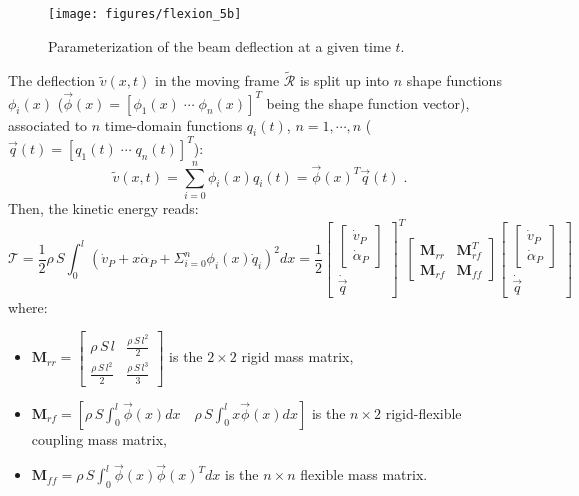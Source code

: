 \begin{figure}[htbp!]
  \texttt{[image: figures/flexion\_5b]}
\caption{Parameterization of the beam deflection at a given time $t$.}
\label{fig:flexion_5} 
\end{figure}
The deflection $\widetilde{v}(x,t)$ in the moving frame $\widetilde{\mathcal{R}}$  is split up into $n$ shape functions $\phi_i(x)$ ($\vec{\phi}(x)=[\phi_1(x)\;\cdots\; \phi_n(x)]^T$ being the shape function vector), associated to $n$ time-domain functions $q_i(t)$, $n=1,\cdots,n$ ($\vec{q}(t)=[q_1(t)\;\cdots\; q_n(t)]^T$):
\begin{equation}\label{eq:decomp}
\widetilde{v}(x,t)=\sum_{i=0}^{n}\phi_i(x)q_i(t)=\vec{\phi}(x)^T\vec{q}(t)\;.
\end{equation}
Then, the kinetic energy reads:
\[
\mathcal{T}=\frac{1}{2}\rho\,S\int_0^l(\dot{v}_P+x\dot{\alpha}_P+\Sigma_{i=0}^{n}\phi_i(x)\dot{q}_i)^2dx=\frac{1}{2}\left[\begin{array}{c}\left[\begin{array}{c}\dot{v}_P\\\dot{\alpha}_P\end{array}\right] \\ \dot{\vec{q}} \end{array}\right]^T\left[\begin{array}{cc}\mathbf{M}_{rr} & \mathbf{M}_{rf}^T \\\mathbf{M}_{rf} & \mathbf{M}_{ff} \end{array}\right]\left[\begin{array}{c}\left[\begin{array}{c}\dot{v}_P\\\dot{\alpha}_P\end{array}\right] \\ \dot{\vec{q}} \end{array}\right]
\]
where:
\begin{itemize}
\item $\mathbf{M}_{rr}=\left[\begin{array}{cc}\scriptstyle{\rho\,S\,l} & \frac{\rho\,S\,l^2}{2} \\ \frac{\rho\,S\,l^2}{2} &\frac{\rho\,S\,l^3}{3} \end{array}\right]$ is the $2\times 2$ rigid mass matrix,
\item $\mathbf{M}_{rf}=[\rho\,S\int_0^l\vec{\phi}(x)dx\quad \rho\,S\int_0^lx\vec{\phi}(x)dx]$ is the $n\times 2$ rigid-flexible coupling mass matrix,
\item $\mathbf{M}_{ff}=\rho\,S\int_0^l\vec{\phi}(x)\vec{\phi}(x)^Tdx$ is the $n\times n$ flexible mass matrix.
\end{itemize}
